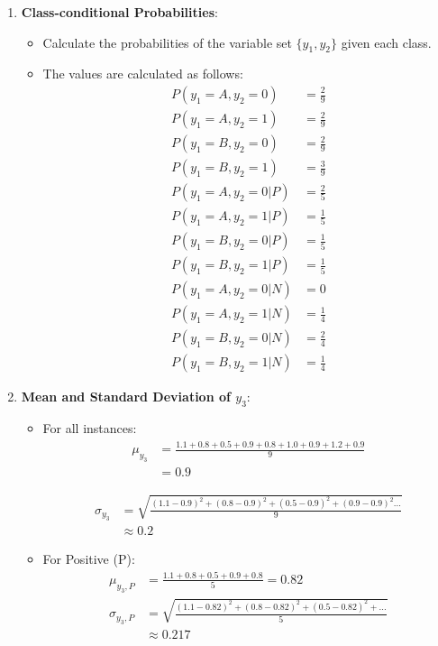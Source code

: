 \documentclass{article}
\begin{document}
\begin{enumerate}[leftmargin=\labelsep]
\begin{enumerate}
    \item \textbf{Class-conditional Probabilities}:
    \begin{itemize}
        \item Calculate the probabilities of the variable set \(\{y_1, y_2\}\) given each class.
        \item The values are calculated as follows:
        \begin{align*}
            P(y_1 = A, y_2 = 0) &= \frac{2}{9} \\
            P(y_1 = A, y_2 = 1) &= \frac{2}{9} \\
            P(y_1 = B, y_2 = 0) &= \frac{2}{9} \\
            P(y_1 = B, y_2 = 1) &= \frac{3}{9} \\
            P(y_1 = A, y_2 = 0 | P) &= \frac{2}{5} \\
            P(y_1 = A, y_2 = 1 | P) &= \frac{1}{5} \\
            P(y_1 = B, y_2 = 0 | P) &= \frac{1}{5} \\
            P(y_1 = B, y_2 = 1 | P) &= \frac{1}{5} \\
            P(y_1 = A, y_2 = 0 | N) &= 0 \\
            P(y_1 = A, y_2 = 1 | N) &= \frac{1}{4} \\
            P(y_1 = B, y_2 = 0 | N) &= \frac{2}{4} \\
            P(y_1 = B, y_2 = 1 | N) &= \frac{1}{4}
        \end{align*}
    \end{itemize}

    \item \textbf{Mean and Standard Deviation of \(y_3\)}:
    \begin{itemize}
        \item For all instances:    
        \begin{align*}
            \mu_{y_3} &= \frac{1.1 + 0.8 + 0.5 + 0.9 + 0.8 + 1.0 + 0.9 + 1.2 + 0.9}{9} \\ 
                      &= 0.9
        \end{align*}
        
        \begin{align*}
            \sigma_{y_3} &= \sqrt{\frac{(1.1 - 0.9)^2 + (0.8 - 0.9)^2 + (0.5 - 0.9)^2 + (0.9 - 0.9)^2...}{9}} \\
                          &\approx 0.2
        \end{align*}
        
        \item For Positive (P):
        \begin{align*}
            \mu_{y_3,P} &= \frac{1.1 + 0.8 + 0.5 + 0.9 + 0.8}{5} = 0.82 \\
            \sigma_{y_3,P} &= \sqrt{\frac{(1.1 - 0.82)^2 + (0.8 - 0.82)^2 + (0.5 - 0.82)^2 + ...}{5}} \\
                          &\approx 0.217
        \end{align*}
        

\end{itemize}
\end{enumerate}
\end{enumerate}
\end{document}
